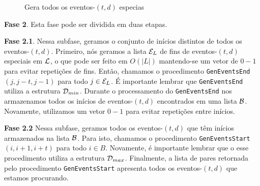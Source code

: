 \documentclass[dissertacao, brazil]{ThesisPUC}
\begin{document}
\begin{figure}

\caption{Gera todos os eventos-$(t,d)$ especias}
\label{prelista}
\end{figure}

\textbf{Fase 2}. Esta fase pode ser dividida em duas etapas.

\textbf{Fase 2.1}. Nessa subfase, geramos o conjunto de inícios distintos de todos os eventos-$(t,d)$.
Primeiro, nós geramos a lista ${\cal E}_L$ de fins de eventos-$(t,d)$ especiais em ${\cal L}$, o que
pode ser feito em $O(|L|)$ mantendo-se um vetor de $0-1$ para evitar repetições de fins. Então,
chamamos o procedimento {\tt GenEventsEnd}$(j, j - t, j - 1)$ para todo $j \in {\cal E}_L$. É 
importante lembrar que {\tt GenEventsEnd} utiliza a estrutura ${\cal D}_{min}$. Durante o processamento
do {\tt GenEventsEnd} nos armazenamos todos os inícios de eventos-$(t,d)$ encontrados em uma lista
${\cal B}$. Novamente, utilizamos um vetor $0-1$ para evitar repetições entre inícios.

\textbf{Fase 2.2} Nessa subfase, geramos todos os eventos-$(t,d)$ que têm inícios armazenados
na lista ${\cal B}$. Para isto, chamamos o procedimento {\tt GenEventsStart}$(i, i + 1, i + t)$ para
todo $i \in B$. Novamente, é importante lembrar que o esse procedimento utiliza a estrutura ${\cal D}_{max}$.
Finalmente, a lista de pares retornada pelo procedimento {\tt GenEventsStart} apresenta todos os eventos-$(t,d)$ que estamos procurando.
\end{document}
